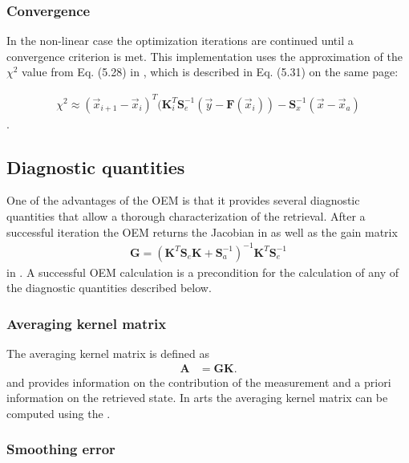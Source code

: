 \subsubsection{Convergence}

In the non-linear case the optimization iterations are continued until 
a convergence criterion is met. This implementation uses the approximation
of the $\chi^2$ value from  Eq. (5.28) in \citet{rodgers:00}, which is
 described in Eq. (5.31) on the same page:

\begin{eqnarray}
\chi^2 \approx (\vec{x}_{i + 1} - \vec{x}_i)^T 
(\mathbf{K}_i^T \mathbf{S}_e^{-1} (\vec{y} - \mathbf{F}(\vec{x}_i))
 - \mathbf{S}_x^{-1}(\vec{x} - \vec{x}_a)
\end{eqnarray}
.

\subsection{Diagnostic quantities}

One of the advantages of the OEM is that it provides several diagnostic
quantities that allow a thorough characterization of the retrieval. After
a successful iteration the OEM returns the Jacobian in
 as well as the  gain matrix 
%
\begin{eqnarray}
\mathbf{G} = (\mathbf{K}^T \mathbf{S}_e\mathbf{K} + \mathbf{S}_a^{-1})^{-1}
\mathbf{K}^T\mathbf{S}_e^{-1}
\end{eqnarray}
%
in . A successful OEM calculation is a precondition for
the calculation of any of the diagnostic quantities described below.

\subsubsection{Averaging kernel matrix}
The averaging kernel matrix is defined as
%
\begin{eqnarray}
\mathbf{A} &= \mathbf{G}\mathbf{K}.
\end{eqnarray}
%
and provides information on the contribution of the measurement and 
a priori information on the retrieved state.  In arts the averaging
kernel matrix can be computed using the .

\subsubsection{Smoothing error}

